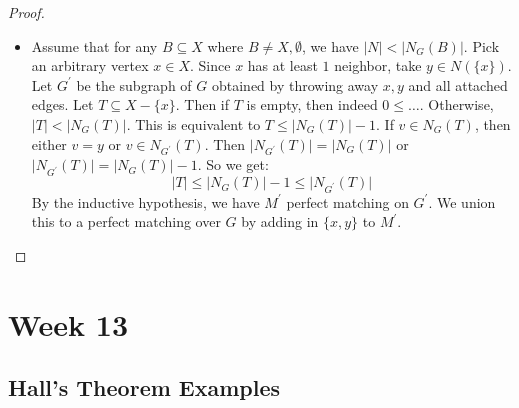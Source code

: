 \documentclass{report}
\begin{document}
\begin{proof}
\begin{itemize}
\begin{itemize}
                        \item Assume that for any $B \subseteq X$ where $B \neq X, \emptyset$, we have $\lvert N \rvert < \lvert N_{G}(B) \rvert$. Pick an arbitrary vertex $x \in X$. Since $x$ has at least $1$ neighbor, take $y \in N(\{x\})$. Let $G^{\prime}$ be the subgraph of $G$ obtained by throwing away $x, y$ and all attached edges. Let $T \subseteq X - \{x\}$. Then if $T$ is empty, then indeed $0 \leq \ldots$. Otherwise, $\lvert T \rvert < \lvert N_{G}(T) \rvert$. This is equivalent to $T \leq \lvert N_{G}(T) \rvert - 1$. If $v \in N_{G}(T)$, then either $v = y$ or $v \in N_{G^{\prime}}(T)$. Then $\lvert N_{G^{\prime}}(T) \rvert = \lvert N_{G}(T) \rvert$ or $\lvert N_{G^{\prime}}(T) \rvert = \lvert N_{G}(T) \rvert - 1$. So we get:
                            \begin{equation*}
                                \lvert T \rvert \leq \lvert N_{G}(T) \rvert - 1 \leq \lvert N_{G^{\prime}}(T) \rvert
                            \end{equation*}
                        By the inductive hypothesis, we have $M^{\prime}$ perfect matching on $G^{\prime}$. We union this to a perfect matching over $G$ by adding in $\{x, y\}$ to $M^{\prime}$.
                    \end{itemize}
            \end{itemize}
    \end{proof}

\chapter{Week 13}

\begin{topic}
    \section{Hall's Theorem Examples}
\end{topic}
\end{document}
